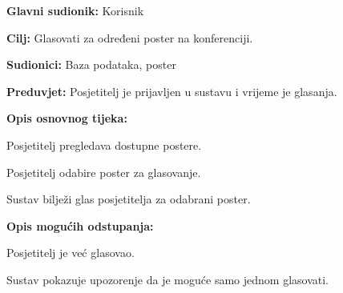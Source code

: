 					\noindent {}
					\begin{packed_item}
						
						\item \textbf{Glavni sudionik: }Korisnik
						\item  \textbf{Cilj:} Glasovati za određeni poster na konferenciji.
						\item  \textbf{Sudionici:} Baza podataka, poster
						\item  \textbf{Preduvjet:} Posjetitelj je prijavljen u sustavu i vrijeme je glasanja.
						\item  \textbf{Opis osnovnog tijeka:}
						
						\item[] \begin{packed_enum}
							
							\item Posjetitelj pregledava dostupne postere.
							\item Posjetitelj odabire poster za glasovanje.
							\item Sustav bilježi glas posjetitelja za odabrani poster.
							
						\end{packed_enum}
						
						\item  \textbf{Opis mogućih odstupanja:}
						
						\item[] \begin{packed_item}
							
							\item[2.a] Posjetitelj je već glasovao.
							\item[] \begin{packed_enum}
								
								\item Sustav pokazuje upozorenje da je moguće samo jednom glasovati.
								
							\end{packed_enum}
							
						\end{packed_item}
					\end{packed_item}
					
